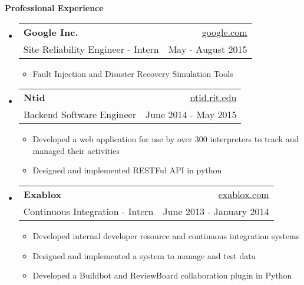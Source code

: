 \documentclass[letterpaper,11pt]{article}
\makeatletter
\newcommand{\resheading}[1]{{\large \colorbox{mygrey}{\begin{minipage}{\textwidth}{\textbf{#1 \vphantom{p\^{E}}}}\end{minipage}}}}
\newcommand{\ressubheading}[4]{
\begin{tabular*}{6.5in}{l@{\extracolsep{\fill}}r}
    \textbf{#1} & #2 \\
    {#3} & {#4} \\
\end{tabular*}\vspace{-6pt}}
\makeatother
\begin{document}
\resheading{Professional Experience}
  \footnotesize
  \begin{itemize}
    \item
      \ressubheading{Google Inc.}{\href{http://www.google.com/}{google.com}}{Site Reliability Engineer - Intern}{May - August 2015}
      \footnotesize
      \begin{itemize}
        \item{Fault Injection and Disaster Recovery Simulation Tools}
      \end{itemize}
    \item
      \ressubheading{Ntid}{\href{http://www.ntid.rit.edu/}{ntid.rit.edu}}{Backend Software Engineer}{June 2014 - May 2015}
      \footnotesize
      \begin{itemize}
        \item{Developed a web application for use by over 300 interpreters to track and managed their activities}
        \item{Designed and implemented RESTFul API in python}
      \end{itemize}
    \item
      \ressubheading{Exablox}{\href{http://www.exablox.com/}{exablox.com}}{Continuous Integration - Intern}{June 2013 - January 2014}
      \footnotesize
      \begin{itemize}
        \item{Developed internal developer resource and continuous integration systems}
        \item{Designed and implemented a system to manage and test data}
        \item{Developed a Buildbot and ReviewBoard collaboration plugin in Python}
      \end{itemize}
  \end{itemize}  %
\end{document}
